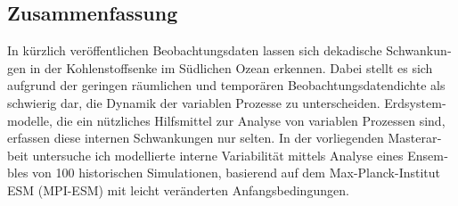 \begin{otherlanguage}{ngerman}
\chapter*{Zusammenfassung}


In kürzlich veröffentlichen Beobachtungsdaten lassen sich dekadische Schwankungen in der Kohlenstoffsenke im Südlichen Ozean erkennen. Dabei stellt es sich aufgrund der geringen räumlichen und temporären Beobachtungsdatendichte als schwierig dar, die Dynamik der variablen Prozesse zu unterscheiden. Erdsystemmodelle, die ein nützliches Hilfsmittel zur Analyse von variablen Prozessen sind, erfassen diese internen Schwankungen nur selten. In der vorliegenden Masterarbeit untersuche ich modellierte interne Variabilität mittels Analyse eines Ensembles von 100 historischen Simulationen,
basierend auf dem Max-Planck-Institut ESM (MPI-ESM) mit leicht
veränderten Anfangsbedingungen.


\end{otherlanguage}
